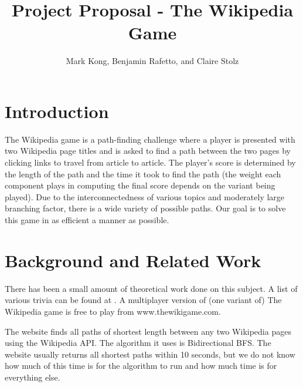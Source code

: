 \documentclass[11pt]{article}
\title{Project Proposal - The Wikipedia Game}
\author{Mark Kong, Benjamin Rafetto, and Claire Stolz}
\begin{document}
\maketitle{}


\section{Introduction}

The Wikipedia game \cite{www.thewikigame.com} is a path-finding challenge where a player is presented with two Wikipedia page titles and is asked to find a path between the two pages by clicking links to travel from article to article. The player's score is determined by the length of the path and the time it took to find the path (the weight each component plays in computing the final score depends on the variant being played). Due to the interconnectedness of various topics and moderately large branching factor,%
there is a wide variety of possible paths. Our goal is to solve this game in as efficient a manner as possible.


\section{Background and Related Work}

There has been a small amount of theoretical work done on this subject. A list of various trivia can be found at \cite{https://en.wikipedia.org/wiki/Wikipedia:Six_degrees_of_Wikipedia}.  A multiplayer version of (one variant of) The Wikipedia game is free to play from www.thewikigame.com.

The website \cite{www.sixdegreesofwikipedia.com} finds all paths of shortest length between any two Wikipedia pages using the Wikipedia API.  The algorithm it uses is Bidirectional BFS.  The website usually returns all shortest paths within 10 seconds, but we do not know how much of this time is for the algorithm to run and how much time is for everything else.
\end{document}
